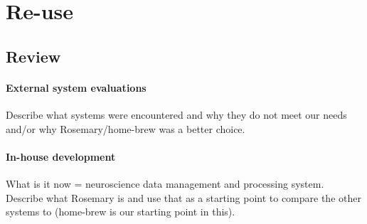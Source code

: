 \section{Re-use}

\subsection{Review}
\paragraph{External system evaluations}
Describe what systems were encountered and why they do not meet our needs and/or why Rosemary/home-brew was a better choice.

\paragraph{In-house development}
What is it now = neuroscience data management and processing system.
Describe what Rosemary is and use that as a starting point to compare the other systems to (home-brew is our starting point in this).